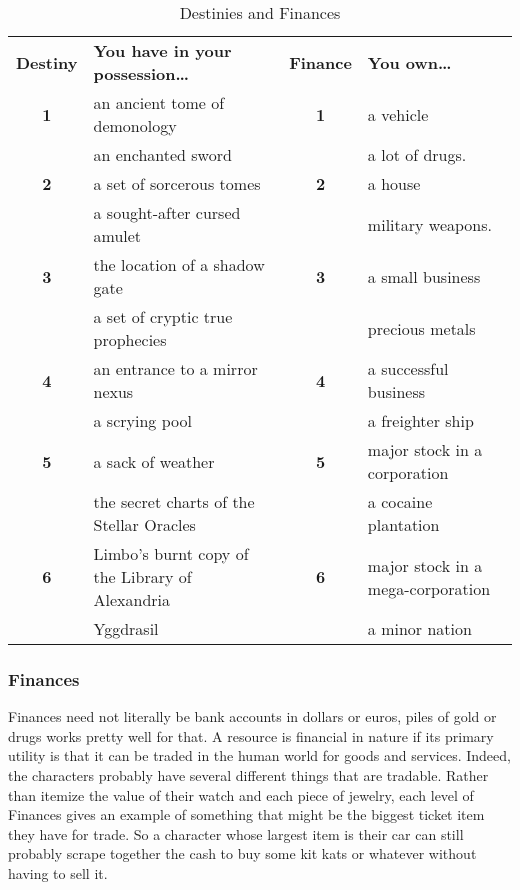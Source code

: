 \begin{table}[htb]\center
\caption{Destinies and Finances}
\begin{tabular}{c p{6.5cm} c p{6cm}}
\textbf{Destiny} & \textbf{You have in your possession\ldots{}}&\textbf{Finance} & \textbf{You own\ldots{}}\\
\textbf{1}  &    an ancient tome of demonology&\textbf{1}  &    a vehicle\\
& an enchanted sword&& a lot of drugs.\\
\textbf{2}  &    a set of sorcerous tomes&\textbf{2}  &    a house\\
& a sought-after cursed amulet&& military weapons.\\
\textbf{3}  &    the location of a shadow gate&\textbf{3}  &    a small business\\
& a set of cryptic true prophecies&& precious metals\\
\textbf{4}  &    an entrance to a mirror nexus&\textbf{4}  &    a successful business\\
& a scrying pool&&  a freighter ship\\
\textbf{5}  &    a sack of weather&\textbf{5}  &    major stock in a corporation\\
& the secret charts of the Stellar Oracles&& a cocaine plantation\\
\textbf{6}  &    Limbo's burnt copy of the Library of Alexandria&\textbf{6}  &    major stock in a mega-corporation\\
& Yggdrasil&& a minor nation\\
\end{tabular}
\end{table}

\subsubsection{Finances}

\hspace{\parindent} Finances need not literally be bank accounts in dollars or euros, piles of gold or drugs works pretty well for that. A resource is financial in nature if its primary utility is that it can be traded in the human world for goods and services. Indeed, the characters probably have several different things that are tradable. Rather than itemize the value of their watch and each piece of jewelry, each level of Finances gives an example of something that might be the biggest ticket item they have for trade. So a character whose largest item is their car can still probably scrape together the cash to buy some kit kats or whatever without having to sell it.

